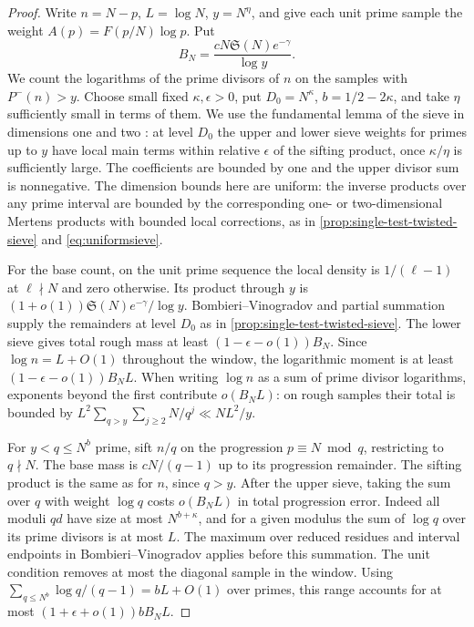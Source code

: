 \documentclass[11pt,a4paper]{article}
\numberwithin{equation}{section}
\newcommand{\SSS}{\mathfrak S}
\begin{document}
\begin{proof}
Write $n=N-p$, $L=\log N$, $y=N^\eta$, and give each unit
prime sample the weight $A(p)=F(p/N)\log p$. Put
\[
 B_N=\frac{cN\SSS(N)e^{-\gamma}}{\log y}.
\]
We count the logarithms of the prime divisors of $n$ on the
samples with $P^-(n)>y$. Choose small fixed $\kappa,\epsilon>0$,
put $D_0=N^\kappa$, $b=1/2-2\kappa$, and take $\eta$ sufficiently
small in terms of them. We use the fundamental lemma of the
sieve in dimensions one and two \cite[Lemma~6.11]{OperaCribro}:
at level $D_0$ the upper and lower sieve weights for primes up
to $y$ have local main terms within relative $\epsilon$ of the
sifting product, once $\kappa/\eta$ is sufficiently large. The
coefficients are bounded by one and the upper divisor sum is
nonnegative. The dimension bounds here are uniform: the inverse
products over any prime interval are bounded by the corresponding
one- or two-dimensional Mertens products with bounded local
corrections, as in \cref{prop:single-test-twisted-sieve}
and \eqref{eq:uniformsieve}.

For the base count, on the unit prime sequence the local
density is $1/(\ell-1)$ at $\ell\nmid N$ and zero otherwise.
Its product through $y$ is $(1+o(1))\SSS(N)e^{-\gamma}/\log y$.
Bombieri--Vinogradov and partial summation supply the remainders
at level $D_0$ as in \cref{prop:single-test-twisted-sieve}.
The lower sieve gives total rough mass at least
$(1-\epsilon-o(1))B_N$. Since $\log n=L+O(1)$ throughout the
window, the logarithmic moment is at least
$(1-\epsilon-o(1))B_NL$. When writing $\log n$ as a sum of
prime divisor logarithms, exponents beyond the first contribute
$o(B_N L)$: on rough samples their total is bounded by
$L^2\sum_{q>y}\sum_{j\ge2}N/q^j\ll NL^2/y$.

For $y<q\le N^b$ prime, sift $n/q$ on the progression
$p\equiv N\bmod q$, restricting to $q\nmid N$. The base mass
is $cN/(q-1)$ up to its progression remainder. The sifting
product is the same as for $n$, since $q>y$. After the upper
sieve, taking the sum over $q$ with weight $\log q$ costs
$o(B_N L)$ in total progression error. Indeed all moduli $qd$
have size at most $N^{b+\kappa}$, and for a given modulus the
sum of $\log q$ over its prime divisors is at most $L$.
The maximum over reduced residues and interval endpoints in
Bombieri--Vinogradov applies before this summation. The unit
condition removes at most the diagonal sample in the window.
Using $\sum_{q\le N^b}\log q/(q-1)=bL+O(1)$ over primes, this
range accounts for at most $(1+\epsilon+o(1))bB_N L$.


\end{proof}
\end{document}
